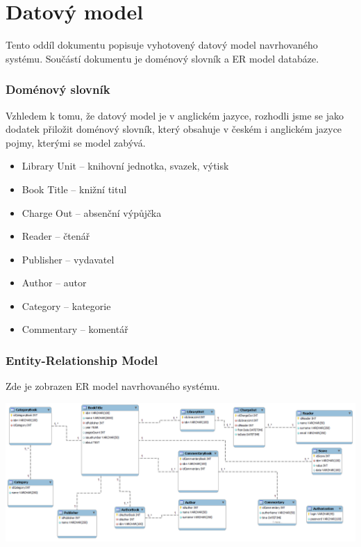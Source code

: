 \documentclass{article}
\begin{document}
\newpage

\part{Datový model}

\vspace{10mm}
\smallskip

\indent \par Tento oddíl dokumentu popisuje vyhotovený datový model navrhovaného
systému. Součástí dokumentu je doménový slovník a ER model databáze.

\newpage

\section{Doménový slovník}

Vzhledem k tomu, že datový model je v anglickém jazyce, rozhodli jsme se jako
dodatek přiložit doménový slovník, který obsahuje v českém i anglickém jazyce
pojmy, kterými se model zabývá.

\begin{itemize}

\item Library Unit -- knihovní jednotka, svazek, výtisk

\item Book Title -- knižní titul

\item Charge Out -- absenční výpůjčka

\item Reader -- čtenář

\item Publisher -- vydavatel

\item Author -- autor

\item Category -- kategorie

\item Commentary -- komentář

\end{itemize}

\newpage


\section{Entity-Relationship Model}

Zde je zobrazen ER model navrhovaného systému.

\bigskip
\includegraphics[width=450pt, angle=90]{../er.png}

\newpage
\tableofcontents 
\end{document}
